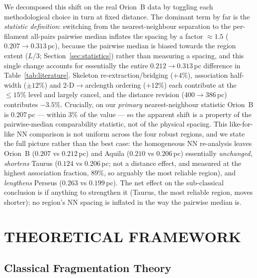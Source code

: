 \documentclass[usenatbib,twoside,twocolumn]{mnras}
\begin{document}
We decomposed this shift on the real Orion~B data by toggling each methodological choice in turn at fixed distance. The dominant term by far is the \emph{statistic definition}: switching from the nearest-neighbour separation to the per-filament all-pairs pairwise median inflates the spacing by a factor $\approx1.5$ ($0.207\to0.313$\,pc), because the pairwise median is biased towards the region extent ($L/3$; Section~\ref{sec:statistics}) rather than measuring a spacing, and this single change accounts for essentially the entire $0.212\to0.313$\,pc difference in Table~\ref{tab:literature}. Skeleton re-extraction/bridging ($+4\%$), association half-width ($\pm12\%$) and 2-D$\to$arclength ordering ($+12\%$) each contribute at the $\le15\%$ level and largely cancel, and the distance revision ($400\to386$\,pc) contributes $-3.5\%$. Crucially, on our \emph{primary} nearest-neighbour statistic Orion~B is $0.207$\,pc --- within $3\%$ of the \citet{Konyves2020} value --- so the apparent shift is a property of the pairwise-median comparability statistic, not of the physical spacing. This like-for-like NN comparison is not uniform across the four robust regions, and we state the full picture rather than the best case: the homogeneous NN re-analysis leaves Orion~B ($0.207$ vs $0.212$\,pc) and Aquila ($0.210$ vs $0.206$\,pc) essentially \emph{unchanged}, \emph{shortens} Taurus ($0.124$ vs $0.206$\,pc; not a distance effect, and measured at the highest association fraction, $89\%$, so arguably the most reliable region), and \emph{lengthens} Perseus ($0.263$ vs $0.199$\,pc). The net effect on the sub-classical conclusion is if anything to strengthen it (Taurus, the most reliable region, moves shorter); no region's NN spacing is inflated in the way the pairwise median is.

\section{THEORETICAL FRAMEWORK}
\label{sec:theory}

\subsection{Classical Fragmentation Theory}
\end{document}
